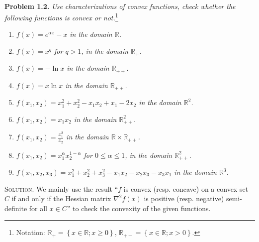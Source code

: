 \documentclass[a4paper]{article}
\numberwithin{equation}{section}
\begin{document}
\\
\textbf{Problem 1.2.} \textit{Use characterizations of convex functions, check whether the following functions is convex or not.}\footnote{Notation: ${\mathbb{R}_ + } = \left\{ {x \in \mathbb{R};x \ge 0} \right\}$, ${\mathbb{R}_{ +  + }} = \left\{ {x \in \mathbb{R};x > 0} \right\}$.}
\begin{enumerate}
\item \textit{$f\left( x \right) = {e^{\alpha x}} - x$ in the domain $\mathbb{R}$.}
\item \textit{$f\left( x \right) = {x^q}$ for $q>1$, in the domain $\mathbb{R}_+$.}
\item \textit{$f\left( x \right) =  - \ln x$ in the domain $\mathbb{R}_{++}$.}
\item \textit{$f\left( x \right) =  x\ln x$ in the domain $\mathbb{R}_{++}$.}
\item \textit{$f\left( {{x_1},{x_2}} \right) = x_1^2 + x_2^2 - {x_1}{x_2} + {x_1} - 2{x_2}$ in the domain $\mathbb{R}^2$.}
\item \textit{$f\left( {{x_1},{x_2}} \right) = {x_1}{x_2}$ in the domain $\mathbb{R}_{++}^2$.}
\item \textit{$f\left( {{x_1},{x_2}} \right) = \frac{{x_1^2}}{{{x_2}}}$ in the domain $\mathbb{R}\times \mathbb{R}_{++}$.}
\item \textit{$f\left( {{x_1},{x_2}} \right) = x_1^\alpha x_2^{1 - \alpha }$ for $0\le \alpha \le 1$, in the domain $\mathbb{R}_{++}^2$.}
\item \textit{$f\left( {{x_1},{x_2},{x_3}} \right) = x_1^2 + x_2^2 + x_3^2 - {x_1}{x_2} - {x_2}{x_3} - {x_3}{x_1}$ in the domain $\mathbb{R}^3$.}
\end{enumerate}
\textsc{Solution.} We mainly use the result ``$f$ is convex (resp. concave) on a convex set $C$ if and only if the Hessian matrix ${\nabla ^2}f\left( x \right)$ is positive (resp. negative) semi-definite for all $x\in C$'' to check the convexity of the given functions.
\end{document}
